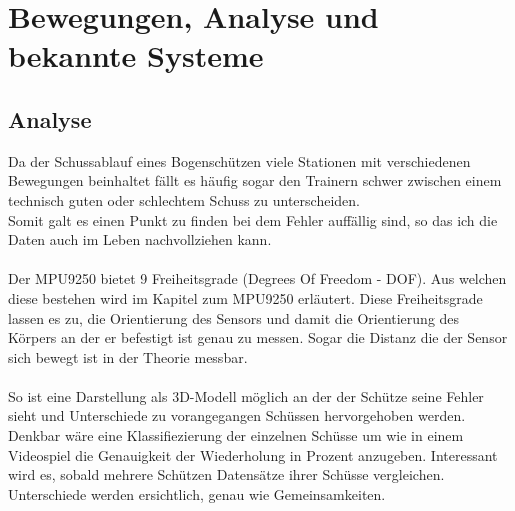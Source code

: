 \chapter{Bewegungen, Analyse und bekannte Systeme}
\section{Analyse}
Da der Schussablauf eines Bogenschützen viele Stationen mit verschiedenen Bewegungen 
beinhaltet fällt es häufig sogar den Trainern schwer zwischen einem technisch guten
oder schlechtem Schuss zu unterscheiden.\\ 
Somit galt es einen Punkt zu finden bei dem Fehler auffällig sind, so das ich die Daten auch im 
Leben nachvollziehen kann.\\
\\
Der MPU9250 bietet 9 Freiheitsgrade (Degrees Of Freedom - DOF). Aus welchen diese bestehen wird
im Kapitel zum MPU9250 erläutert. Diese Freiheitsgrade lassen es zu, die Orientierung des Sensors 
und damit die Orientierung des Körpers an der er befestigt ist genau zu messen. Sogar die Distanz 
die der Sensor sich bewegt ist in der Theorie messbar.\\
\\
So ist eine Darstellung als 3D-Modell möglich an der der Schütze seine Fehler sieht und Unterschiede
zu vorangegangen Schüssen hervorgehoben werden. \\
Denkbar wäre eine Klassifiezierung der einzelnen Schüsse um wie in einem Videospiel die Genauigkeit
der Wiederholung in Prozent anzugeben. Interessant wird es, sobald mehrere Schützen Datensätze
ihrer Schüsse vergleichen. Unterschiede werden ersichtlich, genau wie Gemeinsamkeiten.\\

